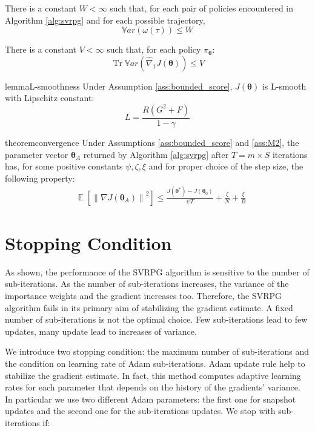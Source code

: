 \documentclass{article}
\theoremstyle{remark}
\theoremstyle{definition}
\DeclareMathOperator*{\EV}{\mathbb{E}}
\DeclareMathOperator{\Tr}{Tr}
\newcommand{\EVV}[2][\ppvect \in \ppspace]{\EV_{#1}\left[{#2}\right]}
\newcommand{\norm}[2][\infty]{\left\|#2\right\|_{#1}}
\newcommand{\vtheta}{\boldsymbol{\theta}}
\newcommand{\pol}{\pi_{\vtheta}}
\newcommand{\gradApp}[2]{\hat{\nabla}_{#2}J(#1)}
\begin{document}
\begin{assumption}\label{ass:M2}
	There is a constant $W<\infty$ such that, for each pair of policies encountered in Algorithm \ref{alg:svrpg} and for each possible trajectory,
\[
	\mathbb{V}ar\left(\omega(\tau)\right) \leq W
\]
\end{assumption}

\begin{assumption}\label{ass:REINFORCE}
There is a constant $V<\infty$ such that, for each policy $\pol$:
\[
	\Tr\mathbb{V}ar\left(\gradApp{\vtheta}{1}\right) \leq V
\]
\end{assumption}

\begin{restatable}[]{lemma}{L-smoothness}\label{lemma:lsmooth}
Under Assumption \ref{ass:bounded_score}, $J(\vtheta)$ is L-smooth with Lipschitz constant:
\[
	L = \frac{R(G^2+F)}{1-\gamma}
\]
\end{restatable}

\begin{restatable}{theorem}{convergence}\label{theo:convergence}
Under Assumptions \ref{ass:bounded_score} and \ref{ass:M2}, the parameter vector $\vtheta_A$ returned by Algorithm \ref{alg:svrpg} after $T=m\times S$ iterations has, for some positive constants $\psi,\zeta, \xi$ and for proper choice of the step size, the following property:
\begin{align*}
	&\EVV[]
	{\norm[]{\nabla J(\vtheta_A)}^2} 
		\leq
		\frac{J(\vtheta^*)-J(\vtheta_0)}{\psi T} +
		\frac{\zeta}{N}
		+\frac{\xi}{B}
\end{align*}
\end{restatable}

\section{Stopping Condition}\label{sec:stopping}
As shown, the performance of the SVRPG algorithm is sensitive to the number of sub-iterations.
As the number of sub-iterations increases, the variance of the importance weights and the gradient increases too.
Therefore, the SVRPG algorithm fails in its primary aim of stabilizing the gradient estimate.
A fixed number of sub-iterations is not the optimal choice.
Few sub-iterations lead to few updates, many update lead to increases of variance.

We introduce two stopping condition: the maximum number of sub-iterations and the condition on learning rate of Adam sub-iterations.
Adam update rule help to stabilize the gradient estimate. In fact, this method computes adaptive learning rates for each parameter that depends on the history of the gradients' variance.
In particular we use two different Adam parameters: the first one for snapshot updates and the second one for the sub-iterations updates.
We stop with sub-iterations if:
\end{document}
